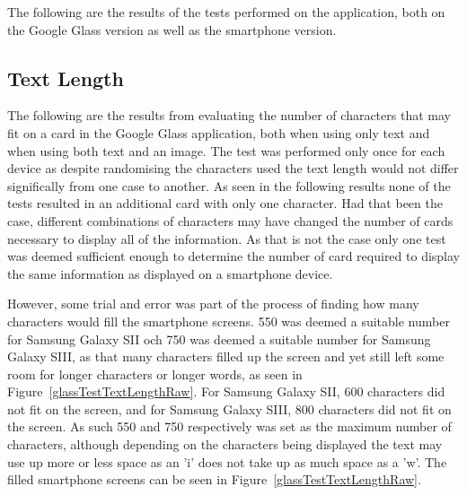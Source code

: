The following are the results of the tests performed on the application, both on the Google Glass version as well as the smartphone version.

\subsection{Text Length}
The following are the results from evaluating the number of characters that may fit on a card in the Google Glass application, both when using only text and when using both text and an image. The test was performed only once for each device as despite randomising the characters used the text length would not differ significally from one case to another. As seen in the following results none of the tests resulted in an additional card with only one character. Had that been the case, different combinations of characters may have changed the number of cards necessary to display all of the information. As that is not the case only one test was deemed sufficient enough to determine the number of card required to display the same information as displayed on a smartphone device.

However, some trial and error was part of the process of finding how many characters would fill the smartphone screens. 550 was deemed a suitable number for Samsung Galaxy SII och 750 was deemed a suitable number for Samsung Galaxy SIII, as that many characters filled up the screen and yet still left some room for longer characters or longer words, as seen in Figure~\ref{glassTestTextLengthRaw}. For Samsung Galaxy SII, 600 characters did not fit on the screen, and for Samsung Galaxy SIII, 800 characters did not fit on the screen. As such 550 and 750 respectively was set as the maximum number of characters, although depending on the characters being displayed the text may use up more or less space as an 'i' does not take up as much space as a 'w'. The filled smartphone screens can be seen in Figure~\ref{glassTestTextLengthRaw}.

